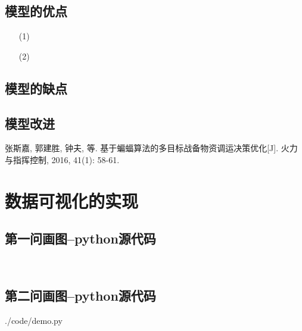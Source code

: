 \documentclass{whutmod}
\begin{document}
		\subsection{模型的优点}
			\begin{itemize}                                             
			\item [(1)]
			\item [(2)] 	
			\end{itemize}
		\subsection{模型的缺点}

  		\subsection{模型改进}

  
  
 
	\newpage	%
	\nocite{*}		%
	\begin{thebibliography}{9}%
		张斯嘉, 郭建胜, 钟夫, 等. 基于蝙蝠算法的多目标战备物资调运决策优化[J]. 火力与指挥控制, 2016, 41(1): 58-61.
	
	\end{thebibliography}

	\newpage
	\appendix %
	\section{数据可视化的实现}
		\subsection*{第一问画图--python源代码}
			\begin{lstlisting}[language=python]
			
			\end{lstlisting}
			
		\subsection*{第二问画图--python源代码}
			 {./code/demo.py}
\end{document}
